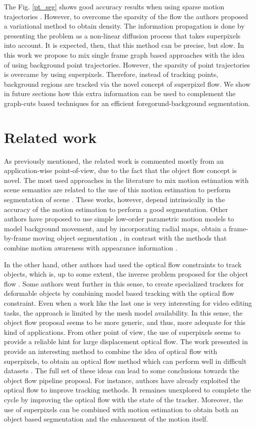 The Fig. \ref{pt_seg} shows good accuracy results when using sparse motion trajectories \cite{c34}. However, to overcome 
the sparsity of the flow the authors proposed a variational method to obtain density. The information propagation is done 
by presenting the problem as a non-linear diffusion process that takes superpixels into account. It is expected, then, that this 
method can be precise, but slow.
In this work we propose to mix single frame graph based approaches with the idea 
of using background point trajectories. However, the sparsity of point trajectories is 
overcame by using superpixels. Therefore, instead of tracking points, background regions are tracked via the novel concept of 
superpixel flow. 
We show in future sections how this extra information can be used to complement the
graph-cuts based techniques for an efficient foregorund-background segmentation. 

\section{Related work}

As previously mentioned, the related work is commented mostly from an application-wise point-of-view, due to the fact that 
the object flow concept is novel. The most used approaches in the literature to mix motion estimation with scene semantics 
are related to the use of this motion estimation to perform segmentation of scene \cite{c33}\cite{c34}. These works, however, depend 
intrinsically in the accuracy of the motion estimation to perform a good segmentation. Other authors have proposed to use simple 
low-order parametric motion models to model background movement, and by incorporating radial maps, obtain a frame-by-frame 
moving object segmentation \cite{c36}, in contrast with the methods that combine motion awareness with appearance information \cite{c35}. 

In the other hand, other authors had used the optical flow constraints to track objects, 
which is, up to some extent, the inverse problem proposed for the object flow \cite{c37}. Some authors went further in this sense, to create specialized trackers 
for deformable objects by combining model based tracking with the optical flow constraint. Even when a work like the last one is very interesting for video editing 
tasks, the approach is limited by the mesh model availability. In this sense, the object flow proposal seems to be more generic, and thus, more adequate for this kind 
of applications.
From other point of view, the use of superpixels seems to provide a reliable hint for large displacement optical flow. The work presented in \cite{c39} 
provide an interesting method to combine the idea of optical flow with superpixels, to obtain an optical flow method which can perform well in difficult datasets \cite{c27}. 
The full set of these ideas can lead to some conclusions towards the object flow pipeline proposal. For instance, authors have already exploited the optical flow 
to improve tracking methods. It remaines unexplored to complete the cycle by improving the optical flow with the state of the tracker. Moreover, the use of superpixels 
can be combined with motion estimation to obtain both an object based segmentation and the enhacement of the motion itself.

